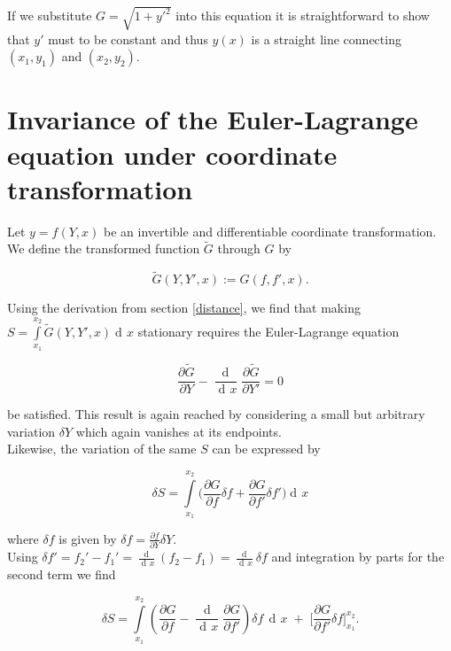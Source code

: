 \documentclass{article}
\DeclareMathOperator{\dd}{d\!}
\DeclareMathOperator{\ddd}{\mathrm{d}}
\begin{document}
If we substitute $G = \sqrt{1+y'^2}$ into this equation it is straightforward to show that $y'$ must to be constant and thus $y(x)$ is a straight line connecting $(x_1,y_1)$ and $(x_2,y_2)$.

\section{Invariance of the Euler-Lagrange equation under coordinate transformation \cite{Kleinert}}

Let $y=f(Y,x)$ be an invertible and differentiable coordinate transformation. We define the transformed function $\widetilde{G}$ through $G$ by

\begin{equation}
\widetilde{G}(Y,Y',x) := G(f,f',x).
\end{equation}

Using the derivation from section \ref{distance}, we find that making $S = \int\limits_{x_1}^{x_2} \widetilde{G}(Y,Y',x) \dd x$ stationary requires the Euler-Lagrange equation

\begin{equation}
\frac{\partial \widetilde{G}}{\partial Y}
- \frac{\dd}{\dd x}\frac{\partial \widetilde{G}}{\partial Y'} = 0
\end{equation}

be satisfied. This result is again reached by considering a small but arbitrary variation $\delta Y$ which again vanishes at its endpoints.\\

Likewise, the variation of the same $S$ can be expressed by

\begin{equation}
\delta S = \int\limits_{x_1}^{x_2} \bigg( \frac{\partial G}{\partial f} \delta f
+ \frac{\partial G}{\partial f'} \delta f' \bigg) \dd x
\end{equation}

where $\delta f$ is given by $\delta f = \frac{\partial f}{\partial Y} \delta Y$. \\


Using $\delta f' = f_2' - f_1' = \frac{\dd}{\dd x}(f_2 - f_1) = \frac{\dd}{\dd x} \delta f$ and integration by parts for the second term we find


\begin{equation}
\delta S = \int\limits_{x_1}^{x_2} \left( \frac{\partial G}{\partial f}
- \frac{\ddd}{\dd x} \frac{\partial G}{\partial f'} \right) \delta f \, \dd x \;
+ \; \bigg[\frac{\partial G}{\partial f'} \delta f \bigg]_{x_1}^{x_2}.
\end{equation}
\end{document}
